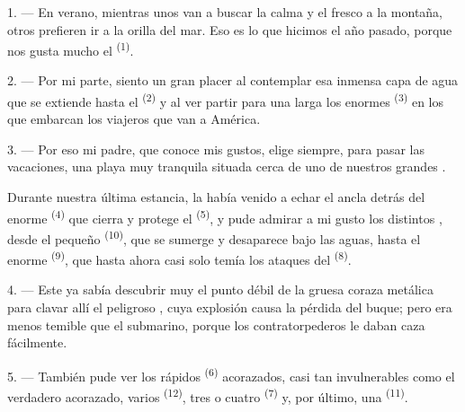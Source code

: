 
\VUsaut{4.0mm}
\VUsaut{3.0mm}
\VUsaut{3.0mm}

1. --- En verano, mientras unos van a buscar la calma y el fresco a la
montaña, otros prefieren ir a la orilla del mar. Eso es lo que hicimos el
año pasado, porque nos gusta mucho el  \textsuperscript{(1)}.

2. --- Por mi parte, siento un gran placer al contemplar esa inmensa capa
de agua que se extiende hasta el  \textsuperscript{(2)} y al ver
partir para una larga  los enormes 
\textsuperscript{(3)} en los que embarcan los viajeros que van a América.

3. --- Por eso mi padre, que conoce mis gustos, elige siempre, para pasar
las vacaciones, una playa muy tranquila situada cerca de uno de nuestros
grandes .

Durante nuestra última estancia, la  había venido a echar
el ancla detrás del enorme  \textsuperscript{(4)} que cierra y protege
el  \textsuperscript{(5)}, y pude admirar a mi gusto los
distintos , desde el pequeño 
\textsuperscript{(10)}, que se sumerge y desaparece bajo las aguas, hasta el enorme
 \textsuperscript{(9)}, que hasta ahora casi solo temía los ataques
del  \textsuperscript{(8)}.

\VUsaut{3.0mm}
\VUsaut{3.0mm}

4. --- Este ya sabía descubrir muy  el punto débil de la
gruesa coraza metálica para clavar allí el peligroso , cuya
explosión causa la pérdida del buque; pero era menos temible que el
submarino, porque los contratorpederos le daban caza fácilmente.

5. --- También pude ver los rápidos  \textsuperscript{(6)}
acorazados, casi tan invulnerables como el verdadero acorazado, varios
 \textsuperscript{(12)}, tres o cuatro 
\textsuperscript{(7)} y, por último, una  \textsuperscript{(11)}.

